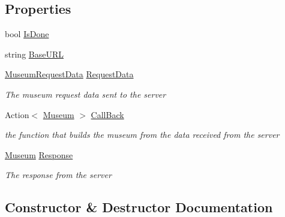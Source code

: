 \subsection*{Properties}
\begin{DoxyCompactItemize}
\item 
bool \mbox{\hyperlink{class_museum_request_afed65eefeb6ae0675fe955f65e80e671}{Is\+Done}}
\item 
string \mbox{\hyperlink{class_museum_request_a05cd8ccf3dcc6fda7ccd84f8d920f013}{Base\+U\+RL}}
\item 
\mbox{\hyperlink{class_museum_request_data}{Museum\+Request\+Data}} \mbox{\hyperlink{class_museum_request_aa08e270eb7e8db5c654f1db0641b71c8}{Request\+Data}}
\begin{DoxyCompactList}\small\item\em The museum request data sent to the server \end{DoxyCompactList}\item 
Action$<$ \mbox{\hyperlink{class_museum}{Museum}} $>$ \mbox{\hyperlink{class_museum_request_a004ce0050bd4782e8074937ba3a71724}{Call\+Back}}
\begin{DoxyCompactList}\small\item\em the function that builds the museum from the data received from the server \end{DoxyCompactList}\item 
\mbox{\hyperlink{class_museum}{Museum}} \mbox{\hyperlink{class_museum_request_aad328b5658542811993e5770a9fb052a}{Response}}
\begin{DoxyCompactList}\small\item\em The response from the server \end{DoxyCompactList}\end{DoxyCompactItemize}


\subsection{Constructor \& Destructor Documentation}
\mbox{\label{class_museum_request_a5912914896c546559a250b0d6c7fd65b}} 
